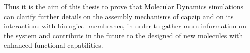 Thus it is the aim of this thesis to prove that Molecular Dynamics simulations can clarify further details on the assembly mechanisms of capzip and on its interactions with biological membranes, in order to gather more information on the system and contribute in the future to the designed of new molecules with enhanced functional capabilities.





%


